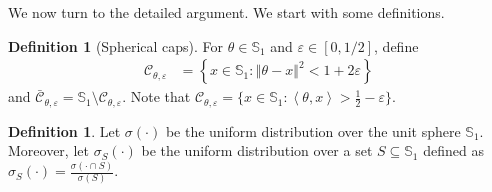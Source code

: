 \documentclass[letter, 12pt]{report}
\newcommand{\ip}[1]{\left \langle #1 \right \rangle}
\newcommand{\paren}[1]{\left( #1 \right)}
\newcommand{\norm}[1]{\left \Vert  #1 \right \Vert}
\newcommand{\cC}{\mathcal C}
\newcommand{\bS}{\mathbb S}
\newcommand{\1}{\mathbf{1}}
\renewcommand{\epsilon}{\varepsilon}
\theoremstyle{plain}
\theoremstyle{definition}
\newtheorem{definition}[theorem]{Definition}
\theoremstyle{remark}
\begin{document}
We now turn to the detailed argument. We start with some definitions.
\begin{definition}[Spherical caps]\label{def:C_theta}
    For \(\theta \in \bS_1\) and $\epsilon \in [0,1/2]$, define
    \begin{align*}
        \cC_{\theta, \epsilon}
         & = \left\{
        x \in \bS_1 : \norm{\theta-x}^2 < 1 + 2\epsilon
        \right\}
        \,
    \end{align*}
    and $\bar{\cC}_{\theta, \epsilon} = \bS_1 \setminus \cC_{\theta, \epsilon}$.
    Note that $\cC_{\theta, \epsilon} = \{x \in \bS_1 : \ip{\theta, x} > \tfrac{1}{2} - \epsilon\}$.
\end{definition}

\begin{definition}\label{def:uniform-sphere}
    Let $\sigma(\cdot)$ be the uniform distribution over the unit sphere $\bS_1$.
    Moreover, let $\sigma_{S}(\cdot)$ be the uniform distribution over a set $S \subseteq \bS_1$
    defined as $\sigma_S(\cdot) = \frac{\sigma(\cdot \cap S)}{\sigma(S)}$.
\end{definition}
\end{document}
